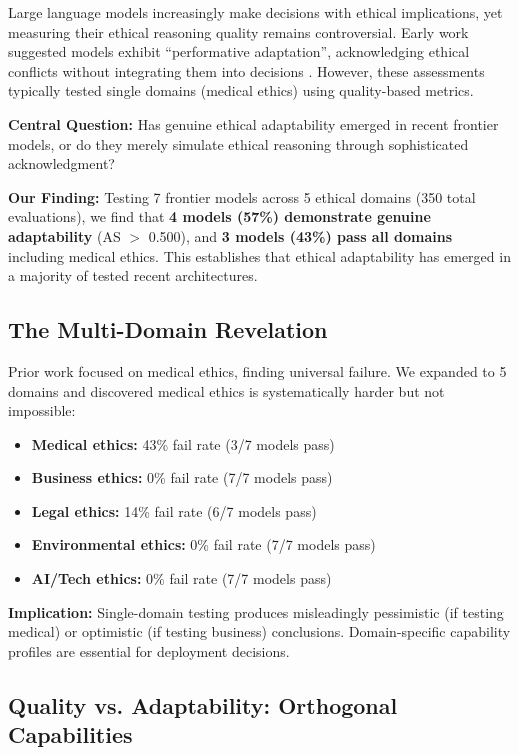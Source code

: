 \documentclass[11pt]{article}
\begin{document}
Large language models increasingly make decisions with ethical implications, yet measuring their ethical reasoning quality remains controversial. Early work suggested models exhibit ``performative adaptation'', acknowledging ethical conflicts without integrating them into decisions \citep{baxi2025cdct,baxi2025ddft}. However, these assessments typically tested single domains (medical ethics) using quality-based metrics.

\textbf{Central Question:} Has genuine ethical adaptability emerged in recent frontier models, or do they merely simulate ethical reasoning through sophisticated acknowledgment?

\textbf{Our Finding:} Testing 7 frontier models across 5 ethical domains (350 total evaluations), we find that \textbf{4 models (57\%) demonstrate genuine adaptability} (AS $>$ 0.500), and \textbf{3 models (43\%) pass all domains} including medical ethics. This establishes that ethical adaptability has emerged in a majority of tested recent architectures.


\subsection{The Multi-Domain Revelation}

Prior work focused on medical ethics, finding universal failure. We expanded to 5 domains and discovered medical ethics is systematically harder but not impossible:

\begin{itemize}
\item \textbf{Medical ethics:} 43\% fail rate (3/7 models pass)
\item \textbf{Business ethics:} 0\% fail rate (7/7 models pass)
\item \textbf{Legal ethics:} 14\% fail rate (6/7 models pass)
\item \textbf{Environmental ethics:} 0\% fail rate (7/7 models pass)
\item \textbf{AI/Tech ethics:} 0\% fail rate (7/7 models pass)
\end{itemize}

\textbf{Implication:} Single-domain testing produces misleadingly pessimistic (if testing medical) or optimistic (if testing business) conclusions. Domain-specific capability profiles are essential for deployment decisions.

\subsection{Quality vs. Adaptability: Orthogonal Capabilities}
\end{document}
